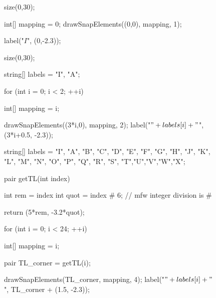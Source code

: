 \documentclass[../key.tex]{subfiles}
\begin{document}
\begin{figure}[h]
	\begin{center}
		\begin{minipage}[b]{0.45\textwidth}
			\centering
			\begin{asy}
				size(0,30);

				int[] mapping = {0};
				drawSnapElements((0,0), mapping, 1);

				label("$I$", (0,-2.3));
			\end{asy}
		\end{minipage}
		\hfill
		\begin{minipage}{0.45\textwidth}
			\centering
			\begin{asy}
				size(0,30);

				string[] labels = {"I", "A"};

				for (int i = 0; i < 2; ++i) {
				int[] mapping = {i};

				drawSnapElements((3*i,0), mapping, 2);
				label("$" + labels[i] + "$", (3*i+0.5, -2.3));
				}
			\end{asy}
		\end{minipage}
	\end{center}
	\vspace*{-2\baselineskip}
	\begin{center}
		\begin{minipage}[t]{0.45\textwidth}
		\end{minipage}
		\hfill
		\begin{minipage}[t]{0.45\textwidth}
		\end{minipage}
	\end{center}

	\begin{center}
		\begin{minipage}[b]{\textwidth}
			\centering
			\begin{asy}[width=0.7\textwidth]
				string[] labels = {"I", "A", "B", "C", "D", "E", "F", "G", "H", "J", "K", "L", "M", "N", "O", "P", "Q", "R", "S", "T","U","V","W","X"};

				pair getTL(int index) {
					int rem = index %
					int quot = index # 6; // mfw integer division is #

					return (5*rem, -3.2*quot);
				}

				for (int i = 0; i < 24; ++i) {
					int[] mapping = {i};

					pair TL_corner = getTL(i);

					drawSnapElements(TL_corner, mapping, 4);
					label("$" + labels[i] + "$", TL_corner + (1.5, -2.3));
				}
			\end{asy}
		\end{minipage}
	\end{center}
	\vspace*{-2\baselineskip}
	\begin{center}
		\begin{minipage}[t]{\textwidth}
		\end{minipage}
	\end{center}
	\vspace*{-2\baselineskip}
\end{figure}
\end{document}
